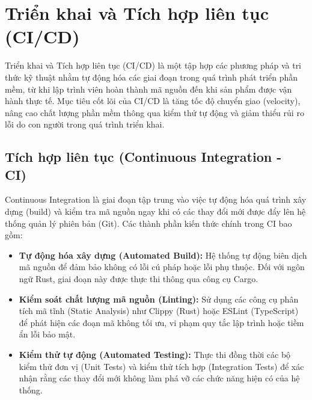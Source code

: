 \section{Triển khai và Tích hợp liên tục (CI/CD)}

Triển khai và Tích hợp liên tục (CI/CD) là một tập hợp các phương pháp và tri thức kỹ thuật nhằm tự động hóa các giai đoạn trong quá trình phát triển phần mềm, từ khi lập trình viên hoàn thành mã nguồn đến khi sản phẩm được vận hành thực tế. Mục tiêu cốt lõi của CI/CD là tăng tốc độ chuyển giao (velocity), nâng cao chất lượng phần mềm thông qua kiểm thử tự động và giảm thiểu rủi ro lỗi do con người trong quá trình triển khai.

\subsection{Tích hợp liên tục (Continuous Integration - CI)}
Continuous Integration là giai đoạn tập trung vào việc tự động hóa quá trình xây dựng (build) và kiểm tra mã nguồn ngay khi có các thay đổi mới được đẩy lên hệ thống quản lý phiên bản (Git). Các thành phần kiến thức chính trong CI bao gồm:
\begin{itemize}
    \item \textbf{Tự động hóa xây dựng (Automated Build):} Hệ thống tự động biên dịch mã nguồn để đảm bảo không có lỗi cú pháp hoặc lỗi phụ thuộc. Đối với ngôn ngữ Rust, giai đoạn này được thực thi thông qua công cụ Cargo.
    \item \textbf{Kiểm soát chất lượng mã nguồn (Linting):} Sử dụng các công cụ phân tích mã tĩnh (Static Analysis) như Clippy (Rust) hoặc ESLint (TypeScript) để phát hiện các đoạn mã không tối ưu, vi phạm quy tắc lập trình hoặc tiềm ẩn lỗi bảo mật.
    \item \textbf{Kiểm thử tự động (Automated Testing):} Thực thi đồng thời các bộ kiểm thử đơn vị (Unit Tests) và kiểm thử tích hợp (Integration Tests) để xác nhận rằng các thay đổi mới không làm phá vỡ các chức năng hiện có của hệ thống.
\end{itemize}

